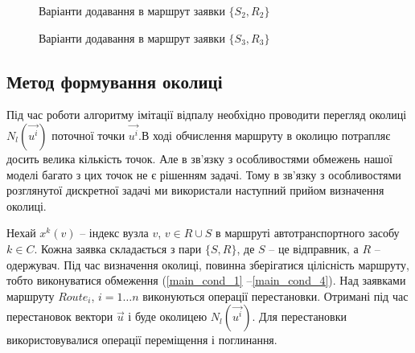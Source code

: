 \documentclass[]{TAACpaper}
\begin{document}
\begin{figure}[t]
	\caption{Варіанти додавання в маршрут заявки $\{S_2,R_2\}$}
	\label{ris:pict2}
\end{figure}

\begin{figure}[t]
	\caption{Варіанти додавання в маршрут заявки $\{S_3,R_3\}$}
	\label{ris:pict3}
\end{figure}

\clearpage


\subsection{Метод формування околиці}
Під час роботи алгоритму імітації відпалу необхідно проводити перегляд околиці $N_{l}(\vec{u^i})$ поточної точки $\vec{u^i}$.В ході обчислення маршруту в околицю потрапляє досить велика кількість точок. Але в зв'язку з особливостями обмежень нашої моделі багато з цих точок не є рішенням задачі. Тому в зв'язку з особливостями розглянутої дискретної задачі ми використали наступний прийом визначення околиці.

Нехай $x^{k}(v)$ -- індекс вузла $v$, $v \in R \cup S$ в маршруті автотранспортного засобу $k \in C$. Кожна заявка складається з пари $\{S,R\}$, де $S$ -- це відправник, а $R$ -- одержувач. Під час визначення околиці, повинна зберігатися цілісність маршруту, тобто виконуватися обмеження (\ref{main_cond_1} --\ref{main_cond_4}). Над заявками маршруту $Route_i$, $i=1 \dots n$ виконуються операції перестановки. Отримані під час перестановок вектори $\vec{u}$ і буде околицею $N_{l}(\vec{u^i})$. Для перестановки використовувалися операції переміщення і поглинання.
\end{document}
